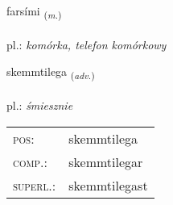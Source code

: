 \documentclass[frontgrid, backgrid]{flacards}\usepackage[]{graphicx}\usepackage[]{xcolor}
\begin{document}
\renewcommand{\flhead}{\vskip5pt \fboxsep=0pt {\small\bfseries\footnotesize Nafnorð | rzeczownik}}
\renewcommand{\fcfoot}{\vskip5pt \fboxsep=0pt \hspace{2pt}{\small\bfseries\footnotesize 3K}}

\renewcommand{\blhead}{\vskip5pt {\small\bfseries\footnotesize Nafnorð | rzeczownik }}
\renewcommand{\bcfoot}{\vskip5pt \hspace{2pt}{\small\bfseries\footnotesize 3K}}


{farsími \small{\textsubscript{(\textit{m.})}} \\[1ex] %
 \\
pl.: \emph{komórka, telefon komórkowy} \\  [2ex]
\renewcommand*{\arraystretch}{0.8}
}

\renewcommand{\flhead}{\vskip5pt \fboxsep=0pt {\small\bfseries\footnotesize Atviksorð | przysłówek}}
\renewcommand{\fcfoot}{\vskip5pt \fboxsep=0pt \hspace{2pt}{\small\bfseries\footnotesize 3K}}

\renewcommand{\blhead}{\vskip5pt {\small\bfseries\footnotesize Atviksorð | przysłówek }}
\renewcommand{\bcfoot}{\vskip5pt \hspace{2pt}{\small\bfseries\footnotesize 3K}}


{skemmtilega \small{\textsubscript{(\textit{adv.})}} \\[1ex] %
\textphonetic{[scɛmtɪlɛɣa]} \\
pl.: \emph{śmiesznie} \\  [2ex]
\renewcommand*{\arraystretch}{0.8}
\begin{tabular}{ll}
\textsc{pos}: & skemmtilega \\ 
\textsc{comp.}: & skemmtilegar \\ 
\textsc{superl.}: & skemmtilegast \\
\end{tabular}
}
\end{document}
